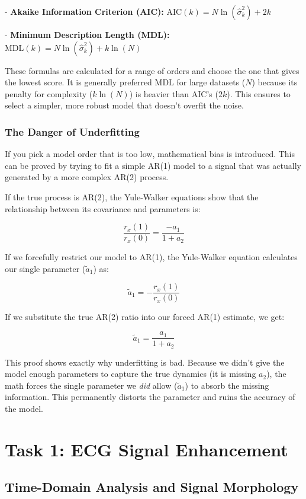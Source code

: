 \documentclass[11pt,a4paper]{article}
\begin{document}
- \textbf{Akaike Information Criterion (AIC):} $\mathrm{AIC}(k) = N \ln(\hat{\sigma}_k^2) + 2k$

- \textbf{Minimum Description Length (MDL):} $\mathrm{MDL}(k) = N \ln(\hat{\sigma}_k^2) + k \ln(N)$

These formulas are calculated for a range of orders and choose the one that gives the lowest score. It is generally preferred MDL for large datasets ($N$) because its penalty for complexity ($k\ln(N)$) is heavier than AIC's ($2k$). This ensures to select a simpler, more robust model that doesn't overfit the noise.

\subsubsection{The Danger of Underfitting}

If you pick a model order that is too low, mathematical bias is introduced. This can be proved by trying to fit a simple AR(1) model to a signal that was actually generated by a more complex AR(2) process.

If the true process is AR(2), the Yule-Walker equations show that the relationship between its covariance and parameters is:

\[
\frac{r_x(1)}{r_x(0)} = \frac{-a_1}{1+a_2}
\]

If we forcefully restrict our model to AR(1), the Yule-Walker equation calculates our single parameter ($\tilde{a}_1$) as:

\[
\tilde{a}_1 = -\frac{r_x(1)}{r_x(0)}
\]

If we substitute the true AR(2) ratio into our forced AR(1) estimate, we get:

\[
\tilde{a}_1 = \frac{a_1}{1+a_2}
\]

This proof shows exactly why underfitting is bad. Because we didn't give the model enough parameters to capture the true dynamics (it is missing $a_2$), the math forces the single parameter we \textit{did} allow ($\tilde{a}_1$) to absorb the missing information. This permanently distorts the parameter and ruins the accuracy of the model.

\section{Task 1: ECG Signal Enhancement}

\subsection{ Time-Domain Analysis and Signal Morphology}
\end{document}
